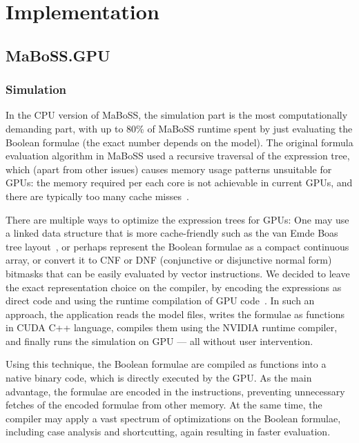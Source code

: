 \documentclass[sn-mathphys-num]{sn-jnl}%
\begin{document}
\section{Implementation}\label{sec:implementation}

\subsection{MaBoSS.GPU}

\subsubsection*{Simulation}

In the CPU version of MaBoSS, the simulation part is the most computationally demanding part, with up to 80\% of MaBoSS runtime spent by just evaluating the Boolean formulae (the exact number depends on the model). The original formula evaluation algorithm in MaBoSS used a recursive traversal of the expression tree, which (apart from other issues) causes memory usage patterns unsuitable for GPUs: the memory required per each core is not achievable in current GPUs, and there are typically too many cache misses~\cite{karlsson2000prefetching}.

There are multiple ways to optimize the expression trees for GPUs: One may use a linked data structure that is more cache-friendly such as the van Emde Boas tree layout~\cite{van1975preserving}, or perhaps represent the Boolean formulae as a compact continuous array, or convert it to CNF or DNF (conjunctive or disjunctive normal form) bitmasks that can be easily evaluated by vector instructions. We decided to leave the exact representation choice on the compiler, by encoding the expressions as direct code and using the runtime compilation of GPU code~\cite{nvrtc}. In such an approach, the application reads the model files, writes the formulae as functions in CUDA C++ language, compiles them using the NVIDIA runtime compiler, and finally runs the simulation on GPU --- all without user intervention.

Using this technique, the Boolean formulae are compiled as functions into a native binary code, which is directly executed by the GPU. As the main advantage, the formulae are encoded in the instructions, preventing unnecessary fetches of the encoded formulae from other memory. At the same time, the compiler may apply a vast spectrum of optimizations on the Boolean formulae, including case analysis and shortcutting, again resulting in faster evaluation.
\end{document}
